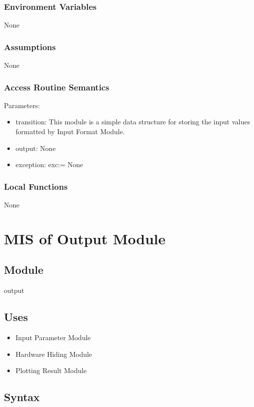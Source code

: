 \documentclass[12pt, titlepage]{article}
\begin{document}
\subsubsection{Environment Variables}

None

\subsubsection{Assumptions}

None

\subsubsection{Access Routine Semantics}

\noindent Parameters:
\begin{itemize}
\item transition: This module is a simple data structure for storing the input values formatted by Input Format Module. 
\item output: None
\item exception: exc:= None
\end{itemize}


\subsubsection{Local Functions}

None

\newpage
\section{MIS of Output Module} \label{Output_Format_Module}

\subsection{Module}
output

\subsection{Uses}
\begin{itemize}
    \item Input Parameter Module 
    \item Hardware Hiding Module    
    \item Plotting Result Module
\end{itemize}

\subsection{Syntax}
\end{document}
